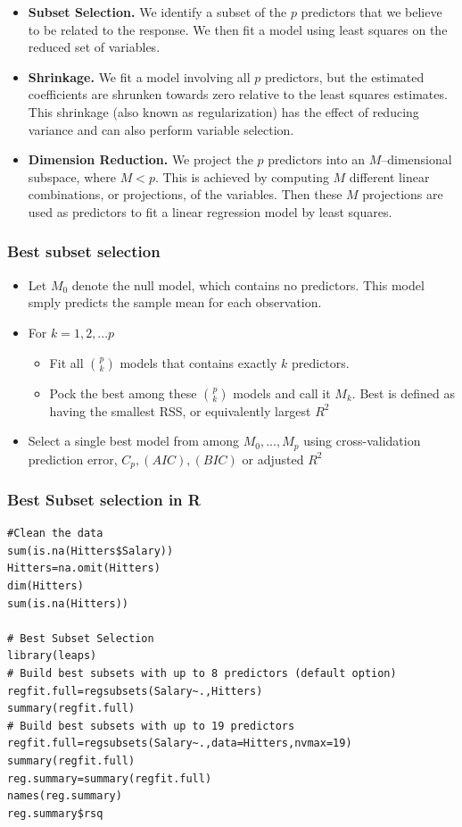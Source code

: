 \documentclass{article}
\begin{document}
\begin{itemize}
  \item \textbf{Subset Selection.}
    We identify a subset of the $p$ predictors that we believe to be related to the response.
    We then fit a model using least squares on the reduced set of variables.
  \item \textbf{Shrinkage.}
    We fit a model involving all $p$ predictors, but the estimated coefficients are shrunken
    towards zero relative to the least squares estimates.
    This shrinkage (also known as regularization) has the effect of reducing variance
    and can also perform variable selection.
  \item \textbf{Dimension Reduction.}
    We project the $p$ predictors into an $M$–dimensional subspace, where $M < p$.
    This is achieved by computing $M$ different linear combinations, or projections,
    of the variables. Then these $M$ projections are used as predictors to fit
    a linear regression model by least squares.
\end{itemize}


\subsubsection{Best subset selection}

\begin{itemize}
    \item Let $M_0$ denote the null model, which contains no predictors. This model smply predicts the sample mean for each observation.
    \item For $k = 1,2,...p$
    \begin{itemize}
        \item Fit all $\binom{p}{k}$ models that contains exactly $k$ predictors.
        \item Pock the best among these $\binom{p}{k}$ models and call it $M_k$. Best is defined as having the smallest RSS, or equivalently largest $R^2$
    \end{itemize}
    \item Select a single best model from among $M_0,...,M_p$ using cross-validation prediction error, $C_p, (AIC) , (BIC)$ or adjusted $R^2$ 
\end{itemize}

\subsubsection{Best Subset selection in R}
\begin{lstlisting}
#Clean the data
sum(is.na(Hitters$Salary))
Hitters=na.omit(Hitters)
dim(Hitters)
sum(is.na(Hitters))

# Best Subset Selection
library(leaps)
# Build best subsets with up to 8 predictors (default option)
regfit.full=regsubsets(Salary~.,Hitters)
summary(regfit.full)
# Build best subsets with up to 19 predictors
regfit.full=regsubsets(Salary~.,data=Hitters,nvmax=19)
summary(regfit.full)
reg.summary=summary(regfit.full)
names(reg.summary)
reg.summary$rsq
\end{lstlisting}
\end{document}
